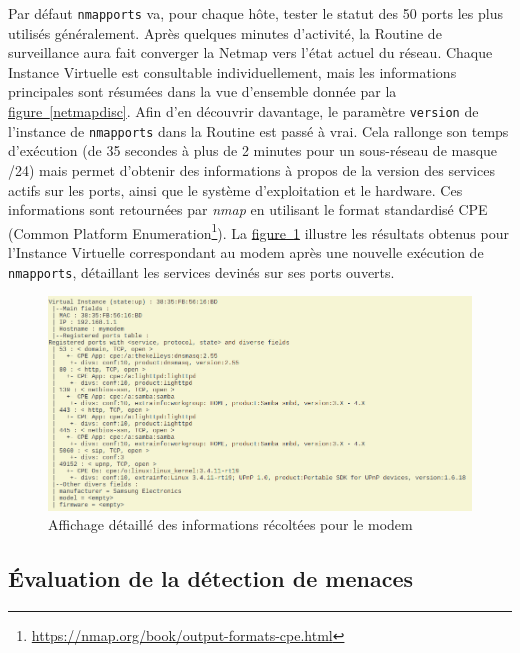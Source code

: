 \documentclass[]{article}
\newcommand{\wordlink}[2]{\hyperref[#1]{#2~\ref{#1}}}
\begin{document}
\par Par défaut \texttt{nmapports} va, pour chaque hôte, tester le statut des 50 ports les plus utilisés généralement. Après quelques minutes d'activité, la Routine de surveillance aura fait converger la Netmap vers l'état actuel du réseau. Chaque Instance Virtuelle est consultable individuellement, mais les informations principales sont résumées dans la vue d'ensemble donnée par la \wordlink{netmapdisc}{figure}. Afin d'en découvrir davantage, le paramètre \texttt{version} de l'instance de \texttt{nmapports} dans la Routine est passé à vrai. Cela rallonge son temps d'exécution (de 35 secondes à plus de 2 minutes pour un sous-réseau de masque /24) mais permet d'obtenir des informations à propos de la version des services actifs sur les ports, ainsi que le système d'exploitation et le hardware. Ces informations sont retournées par \textit{nmap} en utilisant le format standardisé CPE (Common Platform Enumeration\footnote{\url{https://nmap.org/book/output-formats-cpe.html}}). La \wordlink{modemdisc}{figure} illustre les résultats obtenus pour l'Instance Virtuelle correspondant au modem après une nouvelle exécution de \texttt{nmapports}, détaillant les services devinés sur ses ports ouverts.

\vspace{0.1cm}

\begin{figure}[!ht]
\centering
     \includegraphics[width=\linewidth]{modemDisc}
     \caption{Affichage détaillé des informations récoltées pour le modem}
     \label{modemdisc}
\end{figure}


\newpage

\subsection{Évaluation de la détection de menaces}
\end{document}
